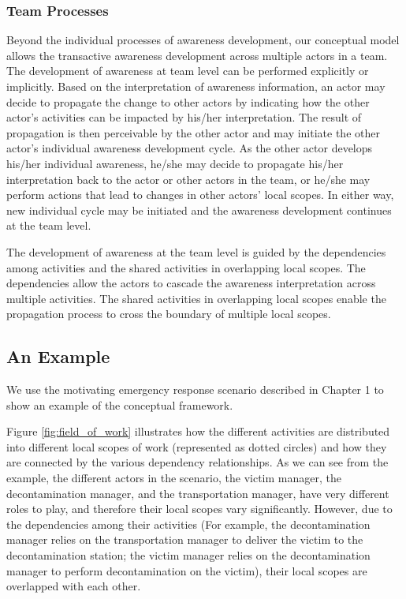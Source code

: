 
\subsubsection{Team Processes} %
\label{ssub:interactive_processes}

Beyond the individual processes of awareness development, our conceptual model allows the transactive awareness development across multiple actors in a team. The development of awareness at team level can be performed explicitly or implicitly. Based on the interpretation of awareness information, an actor may decide to propagate the change to other actors by indicating how the other actor's activities can be impacted by his/her interpretation. The result of propagation is then perceivable by the other actor and may initiate the other actor's individual awareness development cycle. As the other actor develops his/her individual awareness, he/she may decide to propagate his/her interpretation back to the actor or other actors in the team, or he/she may perform actions that lead to changes in other actors' local scopes. In either way, new individual cycle may be initiated and the awareness development continues at the team level.

The development of awareness at the team level is guided by the dependencies among activities and the shared activities in overlapping local scopes. The dependencies allow the actors to cascade the awareness interpretation across multiple activities. The shared activities in overlapping local scopes enable the propagation process to cross the boundary of multiple local scopes.

\subsection{An Example} %
\label{sub:an_example}
We use the motivating emergency response scenario described in Chapter 1 to show an example of the conceptual framework. 

Figure \ref{fig:field_of_work} illustrates how the different activities are distributed into different local scopes of work (represented as dotted circles) and how they are connected by the various dependency relationships. As we can see from the example, the different actors in the scenario, the victim manager, the decontamination manager, and the transportation manager, have very different roles to play, and therefore their local scopes vary significantly. However, due to the dependencies among their activities (For example, the decontamination manager relies on the transportation manager to deliver the victim to the decontamination station; the victim manager relies on the decontamination manager to perform decontamination on the victim), their local scopes are overlapped with each other.


